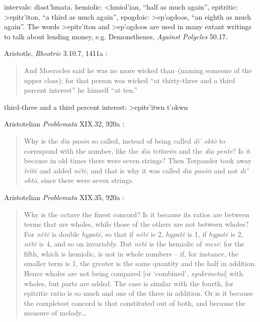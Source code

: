 \documentclass{article}
\newcommand{\textgreek}[1]{\begingroup\fontencoding{LGR}\selectfont#1\endgroup}
\theoremstyle{definition}
\begin{document}
intervals: \textgreek{diast'hmata}.
hemiolic: \textgreek{<hmiol'ian}, ``half as much again'',
epitritic: \textgreek{>epitr'iton}, ``a third as much again'',
epogdoic: \textgreek{>ep'ogdoos}, ``an eighth as much again''. The words \textgreek{>epitr'iton} and
\textgreek{>ep'ogdoos} are used in many extant writings to talk about lending money, e.g. Demonsthenes, {\em Against Polycles} 50.17.

Aristotle, {\em Rheotric} 3.10.7, 1411a \cite[p.~220]{rhetoric}:

\begin{quote}
And Moerocles said he was no more
wicked than--(naming someone of the upper class); for that person
was wicked ``at thirty-three and a third percent interest'' he himself
``at ten.''
\end{quote}

third-three and a third percent interest: \textgreek{>epitr'itwn t'okwn}

Aristotelian {\em Problemata} XIX.32, 920a \cite[pp.~198]{GMWI}:

\begin{quote}
Why is the {\em dia pas\={o}n} so called, instead of being called {\em di' okt\={o}} to correspond
with the number, like the {\em dia tettar\={o}n} and the {\em dia pente}? Is it because in old
times there were seven strings? Then Terpander took away {\em trit\={e}} and added
{\em n\={e}t\={e}}, and that is why it was called {\em dia pas\={o}n} and not {\em di' okt\={o}}, since there
were seven strings.
\end{quote}

Aristotelian {\em Problemata} XIX.35, 920a \cite[pp.~93]{barker}:

\begin{quote}
Why is the octave the finest concord? Is it because its ratios are
between terms that are wholes, while those of the others are not between
wholes? For {\em n\={e}t\={e}} is double {\em hypat\={e}}, so that if {\em n\={e}t\={e}} is 2, {\em hypat\={e}}
is 1, if {\em hypat\={e}} is
2, {\em n\={e}t\={e}} is 4, and so on invariably. But {\em n\={e}t\={e}} is the hemiolic of {\em mes\={e}}:
for the fifth, which is hemiolic, is not in whole numbers -- if, for instance, the smaller term
is 1, the greater is the same quantity and the half in addition. Hence wholes are
not being compared [or `combined', {\em synkrinetai}] with wholes, but parts are
added. The case is similar with the fourth, for epitritic ratio is so much and one
of the three in addition. Or is it because the completest concord is that
constituted out of both, and because the measure of melody\dots
\end{quote}
\end{document}
